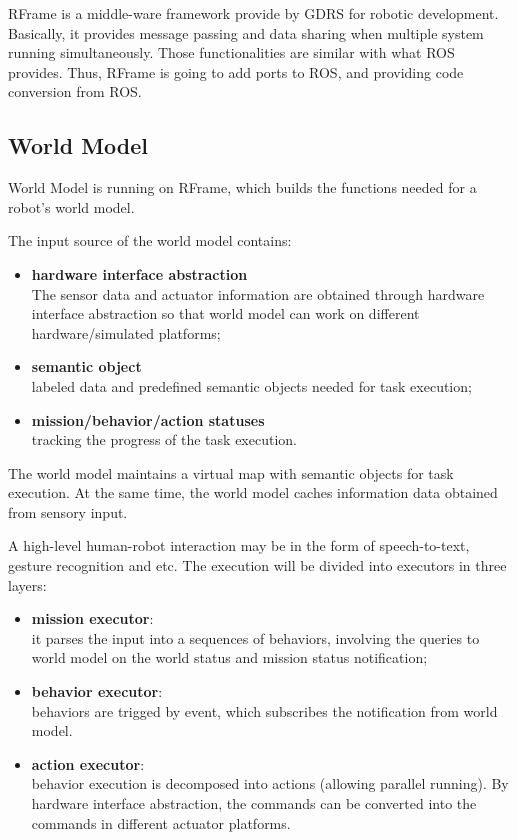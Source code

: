 \documentclass[12pt]{article}
\begin{document}
RFrame is a middle-ware framework provide by GDRS for robotic development. Basically, it provides message passing and data sharing when multiple system running simultaneously. Those functionalities are similar with what ROS provides. Thus, RFrame is going to add ports to ROS, and providing code conversion from ROS.

\subsection{World Model}

World Model is running on RFrame, which builds the functions needed for a robot's world model.

The input source of the world model contains:
\begin{itemize}
\item \textbf{hardware interface abstraction} \\
The sensor data and actuator information are obtained through hardware interface abstraction so that world model can work on different hardware/simulated platforms;
\item \textbf{semantic object} \\
labeled data and predefined semantic objects needed for task execution;
\item \textbf{mission/behavior/action statuses} \\
tracking the progress of the task execution.
\end{itemize}

The world model maintains a virtual map with semantic objects for task execution. At the same time, the world model caches information data obtained from sensory input.

A high-level human-robot interaction may be in the form of speech-to-text, gesture recognition and etc. The execution will be divided into executors in three layers: 
\begin{itemize}
\item \textbf{mission executor}: \\
it parses the input into a sequences of behaviors, involving the queries to world model on the world status and mission status notification;
\item \textbf{behavior executor}: \\
behaviors are trigged by event, which subscribes the notification from world model.
\item \textbf{action executor}: \\
behavior execution is decomposed into actions (allowing parallel running). By hardware interface abstraction, the commands can be converted into the commands in different actuator platforms.

\end{itemize} 
\end{document}
